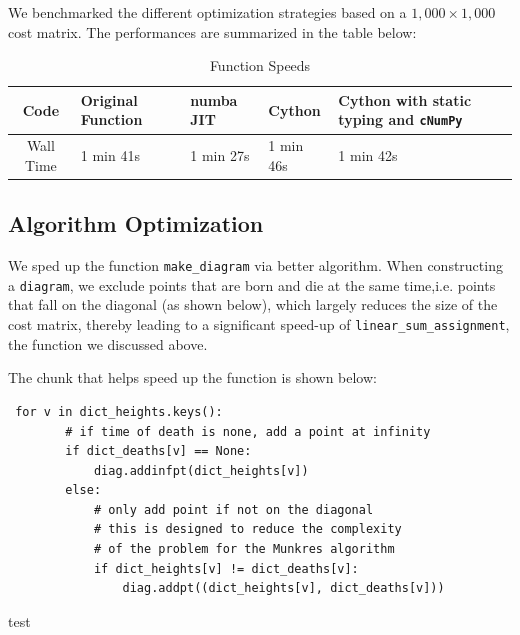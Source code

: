 \documentclass[codesnippet]{jss}
\begin{document}
We benchmarked the different optimization strategies based on a $1,000 \times 1,000$ cost matrix. The performances are  summarized in the table below:
\begin{table}[]
\centering
\caption{Function Speeds}
\label{my-label}
\begin{tabular}{@{}|c|l|l|l|l|@{}}
\toprule
Code      & Original Function & numba JIT & Cython    & Cython with static typing and \texttt{cNumPy} \\ \midrule
Wall Time & 1 min 41s         & 1 min 27s & 1 min 46s & 1 min 42s                                       \\ \bottomrule
\end{tabular}
\end{table}

\subsection{Algorithm Optimization}
We sped up the function \texttt{make\_diagram} via better algorithm. When constructing a \texttt{diagram}, we exclude points that are born and die at the same time,i.e. points that fall on the diagonal (as shown below), which largely reduces the size of the cost matrix, thereby leading to a significant speed-up of \texttt{linear\_sum\_assignment}, the function we discussed above.  

The chunk that helps speed up the function is shown below:
\begin{verbatim}
 for v in dict_heights.keys():
        # if time of death is none, add a point at infinity
        if dict_deaths[v] == None:
            diag.addinfpt(dict_heights[v])
        else:
            # only add point if not on the diagonal
            # this is designed to reduce the complexity
            # of the problem for the Munkres algorithm
            if dict_heights[v] != dict_deaths[v]:
                diag.addpt((dict_heights[v], dict_deaths[v]))
\end{verbatim}
test \citet{foo2010}
%

\end{document}
